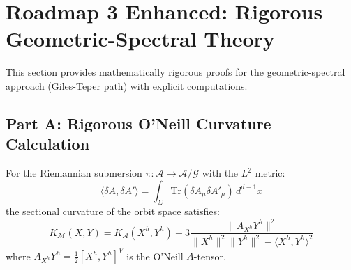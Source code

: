 \section{Roadmap 3 Enhanced: Rigorous Geometric-Spectral Theory}
\label{sec:roadmap3-enhanced}

This section provides mathematically rigorous proofs for the geometric-spectral 
approach (Giles-Teper path) with explicit computations.

\subsection{Part A: Rigorous O'Neill Curvature Calculation}

\begin{theorem}
\label{thm:oneill-complete}
For the Riemannian submersion $\pi: \mathcal{A} \to \mathcal{A}/\mathcal{G}$ with 
the $L^2$ metric:
\begin{equation}
\langle \delta A, \delta A' \rangle = \int_\Sigma \mathrm{Tr}(\delta A_\mu \delta A'_\mu) \, d^{d-1}x
\end{equation}
the sectional curvature of the orbit space satisfies:
\begin{equation}
K_{\mathcal{M}}(X, Y) = K_{\mathcal{A}}(X^h, Y^h) + 3\frac{\|A_{X^h} Y^h\|^2}{\|X^h\|^2\|Y^h\|^2 - \langle X^h, Y^h\rangle^2}
\end{equation}
where $A_{X^h} Y^h = \frac{1}{2}[X^h, Y^h]^V$ is the O'Neill $A$-tensor.
\end{theorem}

